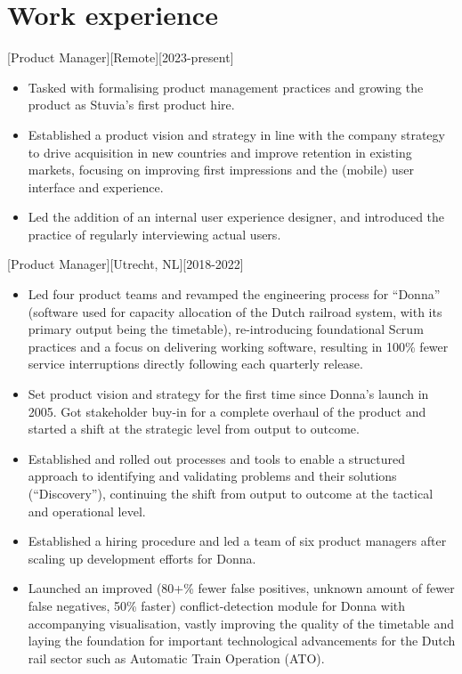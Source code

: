 \documentclass[10pt]{article}
\begin{document}
\makecvtitle

\section{Work experience}
\label{sec:work}

[Product Manager][Remote][2023-present]
\begin{itemize}
    \item Tasked with formalising product management practices and growing the product as Stuvia's first product hire.
    \item Established a product vision and strategy in line with the company strategy to drive acquisition in new countries and improve retention in existing markets, focusing on improving first impressions and the (mobile) user interface and experience.
    \item Led the addition of an internal user experience designer, and introduced the practice of regularly interviewing actual users.
\end{itemize}

[Product Manager][Utrecht, NL][2018-2022]
\begin{itemize}
    \item Led four product teams and revamped the engineering process for \enquote{Donna} (software used for capacity allocation of the Dutch railroad system, with its primary output being the timetable), re-introducing foundational Scrum practices and a focus on delivering working software, resulting in 100\% fewer service interruptions directly following each quarterly release.
    \item Set product vision and strategy for the first time since Donna's launch in 2005. Got stakeholder buy-in for a complete overhaul of the product and started a shift at the strategic level from output to outcome.
    \item Established and rolled out processes and tools to enable a structured approach to identifying and validating problems and their solutions (\enquote{Discovery}), continuing the shift from output to outcome at the tactical and operational level.
    \item Established a hiring procedure and led a team of six product managers after scaling up development efforts for Donna.
    \item Launched an improved (80+\% fewer false positives, unknown amount of fewer false negatives, 50\% faster) conflict-detection module for Donna with accompanying visualisation, vastly improving the quality of the timetable and laying the foundation for important technological advancements for the Dutch rail sector such as Automatic Train Operation (ATO).
\end{itemize}
\end{document}

